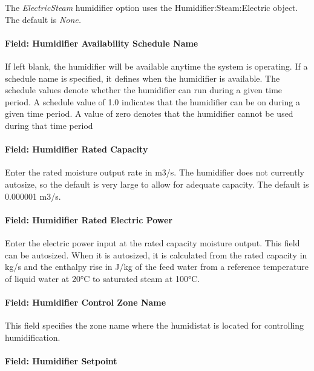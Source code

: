 The \emph{ElectricSteam} humidifier option uses the Humidifier:Steam:Electric object. The default is \emph{None.}

\paragraph{Field: Humidifier Availability Schedule Name}\label{field-humidifier-availability-schedule-name-4}

If left blank, the humidifier will be available anytime the system is operating. If a schedule name is specified, it defines when the humidifier is available. The schedule values denote whether the humidifier can run during a given time period. A schedule value of 1.0 indicates that the humidifier can be on during a given time period. A value of zero denotes that the humidifier cannot be used during that time period

\paragraph{Field: Humidifier Rated Capacity}\label{field-humidifier-rated-capacity-4}

Enter the rated moisture output rate in m3/s. The humidifier does not currently autosize, so the default is very large to allow for adequate capacity. The default is 0.000001 m3/s.

\paragraph{Field: Humidifier Rated Electric Power}\label{field-humidifier-rated-electric-power-4}

Enter the electric power input at the rated capacity moisture output. This field can be autosized. When it is autosized, it is calculated from the rated capacity in kg/s and the enthalpy rise in J/kg of the feed water from a reference temperature of liquid water at 20°C to saturated steam at 100°C.

\paragraph{Field: Humidifier Control Zone Name}\label{field-humidifier-control-zone-name-4}

This field specifies the zone name where the humidistat is located for controlling humidification.

\paragraph{Field: Humidifier Setpoint}\label{field-humidifier-setpoint-3}

